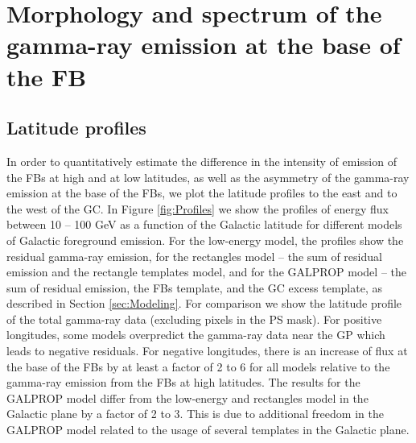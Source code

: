 \section{Morphology and spectrum of the gamma-ray emission at the base of the FB}


\subsection{Latitude profiles}
\label{sec:Latitude_profiles}

In order to quantitatively estimate the difference in the intensity of emission of the FBs at high and at low latitudes, as well as the asymmetry
of the gamma-ray emission at the base of the FBs,
we plot the latitude profiles to the east and to the west of the GC.
In Figure \ref{fig:Profiles} we show the profiles of energy flux between 10 -- 100 GeV as a function 
of the Galactic latitude for different models of Galactic foreground emission.
For the low-energy model, the profiles show the residual gamma-ray emission, 
for the rectangles model -- the sum of residual emission and the rectangle templates model, 
and for the GALPROP model --  the sum of residual emission, the FBs template, 
and the GC excess template, as described in Section \ref{sec:Modeling}. 
For comparison we show the latitude profile of the total gamma-ray data (excluding pixels in the PS mask).
For positive longitudes,
some models overpredict the gamma-ray data near the GP which leads to negative residuals.
For negative longitudes, there is an increase of flux at the base of the FBs 
by at least a factor of 2 to 6 for all models relative to the gamma-ray emission from the FBs at high latitudes. 
The results for the GALPROP model differ from the low-energy and rectangles model in the Galactic plane by a factor of 2 to 3. 
This is due to additional freedom in the GALPROP model related to the usage of several templates in the Galactic plane.


